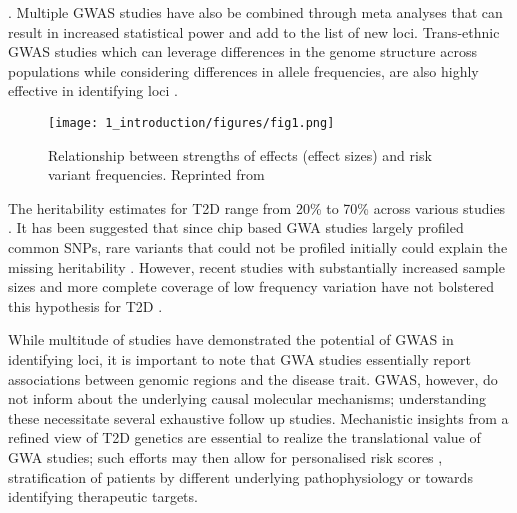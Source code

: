 \cite{fuchsbergerGeneticArchitectureType2016a, mahajanRefiningAccuracyValidated2018, mahajanFinemappingTypeDiabetes2018}. Multiple GWAS studies have also be combined through meta analyses that can result in increased statistical power and add to the list of new loci. Trans-ethnic GWAS studies which can leverage differences in the genome structure across populations while considering differences in allele frequencies, are also highly effective in identifying loci \cite{prasadGeneticsTypeDiabetes2015, thediabetesgeneticsreplicationandmeta-analysisdiagramconsortiumGenomewideTransancestryMetaanalysis2014, liTransethnicGenomewideAssociation2014}. 


\begin{figure}
        \centering
        \texttt{[image: 1\_introduction/figures/fig1.png]}
        \caption[Relationship between strengths of effects (effect sizes) and risk variant frequencies]{Relationship between strengths of effects (effect sizes) and risk variant frequencies. Reprinted from \cite{manolioFindingMissingHeritability2009}}
        \label{fig:ci_f1}
\end{figure}


The heritability estimates for T2D range from 20\% to 70\% across various studies \cite{poulsenHeritabilityTypeII1999, almgrenHeritabilityFamilialityType2011, prasadGeneticsTypeDiabetes2015, mahajanFinemappingTypeDiabetes2018}. It has been suggested that since chip based GWA studies largely profiled common SNPs, rare variants that could not be profiled initially could explain the missing heritability \cite{dicksonRareVariantsCreate2010}. However, recent studies with substantially increased sample sizes and more complete coverage of low frequency variation have not bolstered this hypothesis for T2D \cite{mahajanRefiningAccuracyValidated2018}.


While multitude of studies have demonstrated the potential of GWAS in identifying loci, it is important to note that GWA studies essentially report associations between genomic regions and the disease trait. GWAS, however, do not inform about the underlying causal molecular mechanisms; understanding these necessitate several exhaustive follow up studies. Mechanistic insights from a refined view of T2D genetics are essential to realize the translational value of GWA studies; such efforts may then allow for personalised risk scores \cite{kheraGenomewidePolygenicScores2018}, stratification of patients by different underlying pathophysiology \cite{udlerTypeDiabetesGenetic2018} or towards identifying therapeutic targets.
                                
